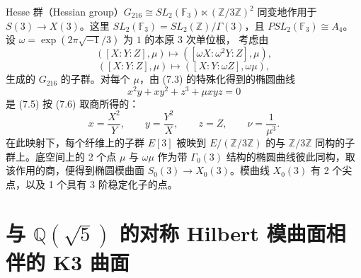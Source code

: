 

Hesse 群（Hessian group）$G_{216}\cong SL_{2}(\mathbb{F}_{3})\ltimes(\mathbb{Z}/3\mathbb{Z})^{2}$ 同变地作用于
$S(3)\to X(3)$。这里 $SL_{2}(\mathbb{F}_{3})=SL_{2}(\mathbb{Z})/\Gamma(3)$，且
$PSL_{2}(\mathbb{F}_{3})\cong A_{4}$。设 $\omega=\exp(2\pi\sqrt{-1}/3)$ 为 $1$ 的本原 $3$ 次单位根，
考虑由
\begin{equation}
  ([X:Y:Z],\mu)\mapsto([\omega X:\omega^{2}Y:Z],\mu), \tag{7.6}
\end{equation}
\begin{equation}
  ([X:Y:Z],\mu)\mapsto([X:Y:\omega Z],\omega\mu), \tag{7.7}
\end{equation}
生成的 $G_{216}$ 的子群。对每个 $\mu$，由 (7.3) 的特殊化得到的椭圆曲线
\begin{equation}
  x^{2}y+xy^{2}+z^{3}+\mu xyz=0 \tag{7.8}
\end{equation}
是 (7.5) 按 (7.6) 取商所得的：
\begin{equation}
  x=\frac{X^{2}}{Y},\qquad y=\frac{Y^{2}}{X},\qquad z=Z,\qquad \nu=\frac{1}{\mu^{3}}. \tag{7.9}
\end{equation}
在此映射下，每个纤维上的子群 $E[3]$ 被映到 $E/(\mathbb{Z}/3\mathbb{Z})$ 的与
$\mathbb{Z}/3\mathbb{Z}$ 同构的子群上。底空间上的 2 个点 $\mu$ 与 $\omega\mu$
作为带 $\Gamma_{0}(3)$ 结构的椭圆曲线彼此同构，取该作用的商，便得到椭圆模曲面
$S_{0}(3)\to X_{0}(3)$。模曲线 $X_{0}(3)$ 有 2 个尖点，以及 1 个具有 3 阶稳定化子的点。

\section{与 $\mathbb{Q}(\sqrt{5})$ 的对称 Hilbert 模曲面相伴的 K3 曲面}

